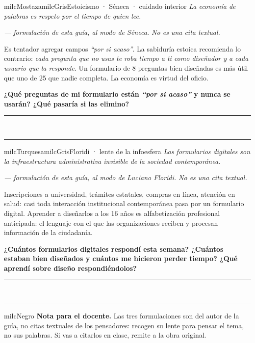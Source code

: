 \documentclass[11pt,letterpaper]{article}
\newcommand{\linead}[1]{\noindent\color{milcLinea}\rule{#1}{0.5pt}\color{milcNegro}}
\begin{document}
\begin{softbox}{milcMostaza}{milcGris}{Estoicismo · Séneca · cuidado interior}
\textit{La economía de palabras es respeto por el tiempo de quien lee.}

{\footnotesize\itshape\color{milcNegro!70}--- formulación de esta guía, al modo de Séneca. No es una cita textual.}

Es tentador agregar campos \emph{``por si acaso''}. La sabiduría estoica recomienda lo contrario: \emph{cada pregunta que no usas te roba tiempo a ti como diseñador y a cada usuario que la responde}. Un formulario de 8 preguntas bien diseñadas es más útil que uno de 25 que nadie completa. La economía es virtud del oficio.

\textbf{¿Qué preguntas de mi formulario están \emph{``por si acaso''} y nunca se usarán? ¿Qué pasaría si las elimino?}
\end{softbox}
\linead{\linewidth}\\[1mm]
\linead{\linewidth}

\begin{softbox}{milcTurquesa}{milcGris}{Floridi · lente de la infoesfera}
\textit{Los formularios digitales son la infraestructura administrativa invisible de la sociedad contemporánea.}

{\footnotesize\itshape\color{milcNegro!70}--- formulación de esta guía, al modo de Luciano Floridi. No es una cita textual.}

Inscripciones a universidad, trámites estatales, compras en línea, atención en salud: casi toda interacción institucional contemporánea pasa por un formulario digital. Aprender a diseñarlos a los 16 años es alfabetización profesional anticipada: el lenguaje con el que las organizaciones reciben y procesan información de la ciudadanía.

\textbf{¿Cuántos formularios digitales respondí esta semana? ¿Cuántos estaban bien diseñados y cuántos me hicieron perder tiempo? ¿Qué aprendí sobre diseño respondiéndolos?}
\end{softbox}
\linead{\linewidth}\\[1mm]
\linead{\linewidth}

\begin{infoband}{milcNegro}
\textbf{Nota para el docente.} Las tres formulaciones son del autor de la guía, no citas textuales de los pensadores: recogen su lente para pensar el tema, no sus palabras. Si vas a citarlos en clase, remite a la obra original.
\end{infoband}
\end{document}
